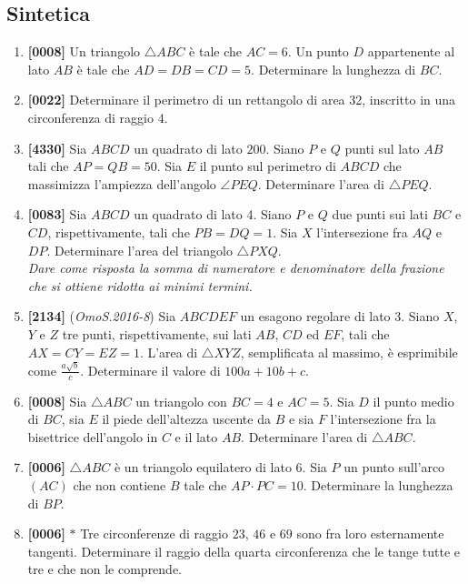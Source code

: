 \documentclass[10pt]{article}
\begin{document}
\subsection{Sintetica}
\begin{enumerate}

\item \textbf{[0008]} Un triangolo $\triangle ABC$ è tale che $AC=6$. Un punto $D$ appartenente al lato $AB$ è tale che $AD=DB=CD=5$. Determinare la lunghezza di $BC$.

\item \textbf{[0022]} Determinare il perimetro di un rettangolo di area 32, inscritto in una circonferenza di raggio 4.

\item \textbf{[4330]} Sia $ABCD$ un quadrato di lato $200$. Siano $P$ e $Q$ punti sul lato $AB$ tali che $AP=QB=50$. Sia $E$ il punto sul perimetro di $ABCD$ che massimizza l'ampiezza dell'angolo $\angle PEQ$. Determinare l'area di $\triangle PEQ$.

\item \textbf{[0083]} Sia $ABCD$ un quadrato di lato 4. Siano $P$ e $Q$ due punti sui lati $BC$ e $CD$, rispettivamente, tali che $PB=DQ=1$. Sia $X$ l'intersezione fra $AQ$ e $DP$. Determinare l'area del triangolo $\triangle PXQ$.\\
\textit{Dare come risposta la somma di numeratore e denominatore della frazione che si ottiene ridotta ai minimi termini.}

\item \textbf{[2134]} (\textit{OmoS.2016-8}) Sia $ABCDEF$ un esagono regolare di lato 3. Siano $X$, $Y$ e $Z$ tre punti, rispettivamente, sui lati $AB$, $CD$ ed $EF$, tali che $AX=CY=EZ=1$. L'area di $\triangle XYZ$, semplificata al massimo, è esprimibile come $\frac{a\sqrt{b}}{c}$. Determinare il valore di $100a+10b+c$.

\item \textbf{[0008]} Sia $\triangle ABC$ un triangolo con $BC=4$ e $AC=5$. Sia $D$ il punto medio di $BC$, sia $E$ il piede dell'altezza uscente da $B$ e sia $F$ l'intersezione fra la bisettrice dell'angolo in $C$ e il lato $AB$. Determinare l'area di $\triangle ABC$.

\item \textbf{[0006]} $\triangle ABC$ è un triangolo equilatero di lato 6. Sia $P$ un punto sull'arco $(AC)$ che non contiene $B$ tale che $AP\cdot PC=10$. Determinare la lunghezza di $BP$.

\item \textbf{[0006]} $\ast$ Tre circonferenze di raggio $23$, $46$ e $69$ sono fra loro esternamente tangenti. Determinare il raggio della quarta circonferenza che le tange tutte e tre e che non le comprende.

\end{enumerate}
\end{document}
